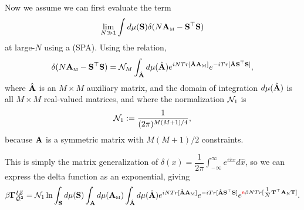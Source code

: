 Now we assume we can first evaluate the term 
\begin{align}
  \lim_{N\gg 1} \int d\mu({\mathbf{S}})    \delta(N{\mathbf{A}}_{\text{\tiny M}}-{\mathbf{S}}^{\top}{\mathbf{S}})
\end{align}
at large-$N$ using a \SaddlePointApproximation (SPA). Using the relation, 
\begin{align}
\delta(N{\mathbf{A}}_{\text{\tiny M}}-{\mathbf{S}}^{\top}{\mathbf{S}})
   =\mathcal{N}_M\int_{\hat{\mathbf{A}}}  d\mu(\hat{\mathbf{A}}) e^{ iN Tr[\hat{\mathbf{A}}{\mathbf{A}}_{\text{\tiny M}}] } e^{ -i Tr[\hat{\mathbf{A}}{\mathbf{S}}^{\top}{\mathbf{S}}] }  ,
\end{align}
where $\hat{\mathbf{A}}$ is an $M \times M$ auxiliary matrix, and the domain of integration $d\mu(\hat{\mathbf{A}})$ is all $M \times M$ real-valued matrices, and where the normalization $\mathcal{N}_1$ is
\begin{align}
  \label{eqn:norm_1}
\mathcal{N}_1:=\frac{1}{(2\pi)^{M(M+1)/4}},
\end{align}
because $\mathbf{A}$ is a symmetric matrix with $M(M+1)/2$ constraints.

This is simply the matrix generalization of
$\delta(x)=\dfrac{1}{2\pi}\int_{-\infty}^{\infty} e^{i\hat{x}x}d\hat{x}$,
so we can express the delta function as an exponential, giving
\begin{align}
\label{eqn:Q2}
\beta\mathbf{\Gamma}^{IZ}_{\bar{\mathcal{Q}}^{2}} = \mathcal{N}_1 \ln\int_{{\mathbf{S}}}  d\mu({\mathbf{S}}) \int_{\mathbf{A}} d\mu({\mathbf{A}}_{\text{\tiny M}}) 
                           \int_{\hat{\mathbf{A}}} d\mu(\hat{\mathbf{A}}) e^{ iN Tr[ \hat{\mathbf{A}}{\mathbf{A}}_{\text{\tiny M}} ] }
                           e^{ -i Tr[ \hat{\mathbf{A}}{\mathbf{S}}^{\top} {\mathbf{S}} ] }
                           e^{  {\color{red}\sf{n}}\beta N Tr[\tfrac{1}{N} {\mathbf{T}}^{\top}{\mathbf{A}}_{\text{\tiny N}}{\mathbf{T}} ] } .
\end{align}

